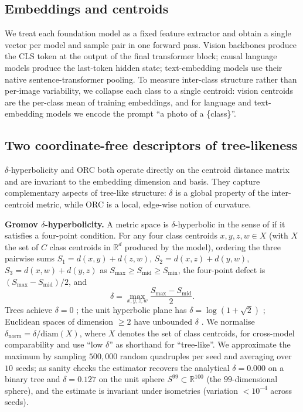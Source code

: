 \documentclass{article}
\begin{document}
\subsection{Embeddings and centroids}
\label{sec:embeddings}

We treat each foundation model as a fixed feature extractor and obtain a single vector per model and sample pair in one forward pass. Vision backbones produce the CLS token at the output of the final transformer block; causal language models produce the last-token hidden state; text-embedding models use their native sentence-transformer pooling. To measure inter-class structure rather than per-image variability, we collapse each class to a single centroid: vision centroids are the per-class mean of training embeddings, and for language and text-embedding models we encode the prompt ``a photo of a \{class\}''.

\subsection{Two coordinate-free descriptors of tree-likeness}
\label{sec:descriptors}

$\delta$-hyperbolicity and ORC both operate directly on the centroid distance matrix and are invariant to the embedding dimension and basis. They capture complementary aspects of tree-like structure: $\delta$ is a global property of the inter-centroid metric, while ORC is a local, edge-wise notion of curvature.

\textbf{Gromov $\delta$-hyperbolicity.} A metric space is $\delta$-hyperbolic in the sense of \citet{Gromov1987} if it satisfies a four-point condition. For any four class centroids $x, y, z, w \in X$ (with $X$ the set of $C$ class centroids in $\mathbb{R}^d$ produced by the model), ordering the three pairwise sums $S_1{=}d(x,y){+}d(z,w)$, $S_2{=}d(x,z){+}d(y,w)$, $S_3{=}d(x,w){+}d(y,z)$ as $S_{\max} \ge S_{\text{mid}} \ge S_{\min}$, the four-point defect is $(S_{\max}-S_{\text{mid}})/2$, and
\begin{equation}
\delta = \max_{x,y,z,w} \frac{S_{\max} - S_{\text{mid}}}{2}.
\end{equation}
Trees achieve $\delta = 0$ \citep{Gromov1987}; the unit hyperbolic plane has $\delta = \log(1{+}\sqrt{2})$ \citep{Gromov1987}; Euclidean spaces of dimension $\geq 2$ have unbounded $\delta$ \citep{Gromov1987}. We normalise $\delta_{\text{norm}} = \delta / \mathrm{diam}(X)$, where $X$ denotes the set of class centroids, for cross-model comparability and use ``low $\delta$'' as shorthand for ``tree-like''. We approximate the maximum by sampling $500{,}000$ random quadruples per seed and averaging over $10$ seeds; as sanity checks the estimator recovers the analytical $\delta = 0.000$ on a binary tree and $\delta = 0.127$ on the unit sphere $S^{99} \subset \mathbb{R}^{100}$ (the $99$-dimensional sphere), and the estimate is invariant under isometries (variation $<10^{-4}$ across seeds).
\end{document}
